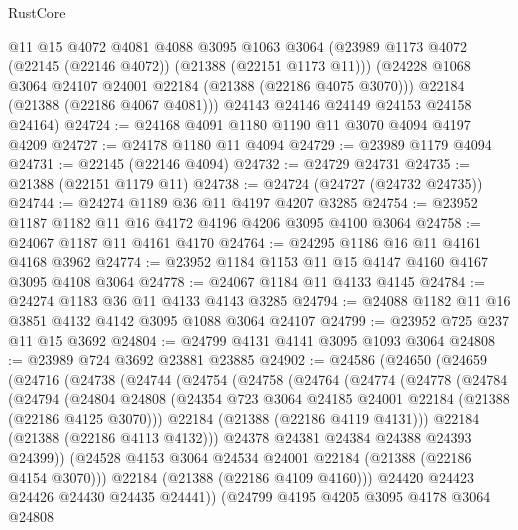 \begin{lexlean}{RustCore}
\begin{coremodule}
        @11
        @15
        @4072
        @4081
        @4088
        @3095
        @1063
        @3064
        (@23989 @1173 @4072 (@22145 (@22146 @4072)) (@21388 (@22151 @1173 @11)))
        (@24228 @1068 @3064 @24107 @24001 @22184 (@21388 (@22186 @4075 @3070)))
        @22184
        (@21388 (@22186 @4067 @4081)))
      @24143
      @24146
      @24149
      @24153
      @24158
      @24164)
@24724 := @24168 @4091 @1180 @1190 @11 @3070 @4094 @4197 @4209
@24727 := @24178 @1180 @11 @4094
@24729 := @23989 @1179 @4094
@24731 := @22145 (@22146 @4094)
@24732 := @24729 @24731
@24735 := @21388 (@22151 @1179 @11)
@24738 := @24724 (@24727 (@24732 @24735))
@24744 := @24274 @1189 @36 @11 @4197 @4207 @3285
@24754 := @23952 @1187 @1182 @11 @16 @4172 @4196 @4206 @3095 @4100 @3064
@24758 := @24067 @1187 @11 @4161 @4170
@24764 := @24295 @1186 @16 @11 @4161 @4168 @3962
@24774 := @23952 @1184 @1153 @11 @15 @4147 @4160 @4167 @3095 @4108 @3064
@24778 := @24067 @1184 @11 @4133 @4145
@24784 := @24274 @1183 @36 @11 @4133 @4143 @3285
@24794 := @24088 @1182 @11 @16 @3851 @4132 @4142 @3095 @1088 @3064 @24107
@24799 := @23952 @725 @237 @11 @15 @3692
@24804 := @24799 @4131 @4141 @3095 @1093 @3064
@24808 := @23989 @724 @3692 @23881 @23885
@24902 := @24586
    (@24650
      (@24659
        (@24716
          (@24738
            (@24744
              (@24754
                (@24758
                  (@24764
                    (@24774
                      (@24778
                        (@24784
                          (@24794
                            (@24804
                              @24808
                              (@24354 @723 @3064 @24185 @24001 @22184 (@21388 (@22186 @4125 @3070)))
                              @22184
                              (@21388 (@22186 @4119 @4131)))
                            @22184
                            (@21388 (@22186 @4113 @4132)))
                          @24378
                          @24381
                          @24384
                          @24388
                          @24393
                          @24399))
                      (@24528 @4153 @3064 @24534 @24001 @22184 (@21388 (@22186 @4154 @3070)))
                      @22184
                      (@21388 (@22186 @4109 @4160)))
                    @24420
                    @24423
                    @24426
                    @24430
                    @24435
                    @24441))
                (@24799
                  @4195
                  @4205
                  @3095
                  @4178
                  @3064
                  @24808

\end{coremodule}
\end{lexlean}
